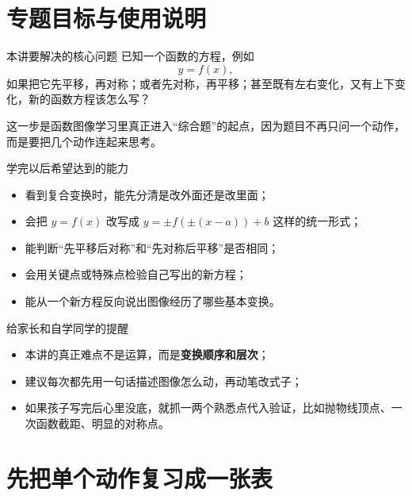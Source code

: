 \documentclass[11pt,a4paper,fontset=fandol]{ctexart}
\theoremstyle{formaltheorem}
\theoremstyle{formalexample}
\begin{document}
\pagestyle{plain}
\tableofcontents
\newpage
\pagestyle{fancy}

\section{专题目标与使用说明}

\begin{goalbox}{本讲要解决的核心问题}
已知一个函数的方程，例如
\[
y=f(x),
\]
如果把它先平移，再对称；或者先对称，再平移；甚至既有左右变化，又有上下变化，新的函数方程该怎么写？

这一步是函数图像学习里真正进入“综合题”的起点，因为题目不再只问一个动作，而是要把几个动作连起来思考。
\end{goalbox}

\begin{goalbox}{学完以后希望达到的能力}
\begin{itemize}
  \item 看到复合变换时，能先分清是改外面还是改里面；
  \item 会把 \(y=f(x)\) 改写成 \(y=\pm f(\pm(x-a))+b\) 这样的统一形式；
  \item 能判断“先平移后对称”和“先对称后平移”是否相同；
  \item 会用关键点或特殊点检验自己写出的新方程；
  \item 能从一个新方程反向说出图像经历了哪些基本变换。
\end{itemize}
\end{goalbox}

\begin{notebox}{给家长和自学同学的提醒}
\begin{itemize}
  \item 本讲的真正难点不是运算，而是\textbf{变换顺序和层次}；
  \item 建议每次都先用一句话描述图像怎么动，再动笔改式子；
  \item 如果孩子写完后心里没底，就抓一两个熟悉点代入验证，比如抛物线顶点、一次函数截距、明显的对称点。
\end{itemize}
\end{notebox}

\section{先把单个动作复习成一张表}
\end{document}
